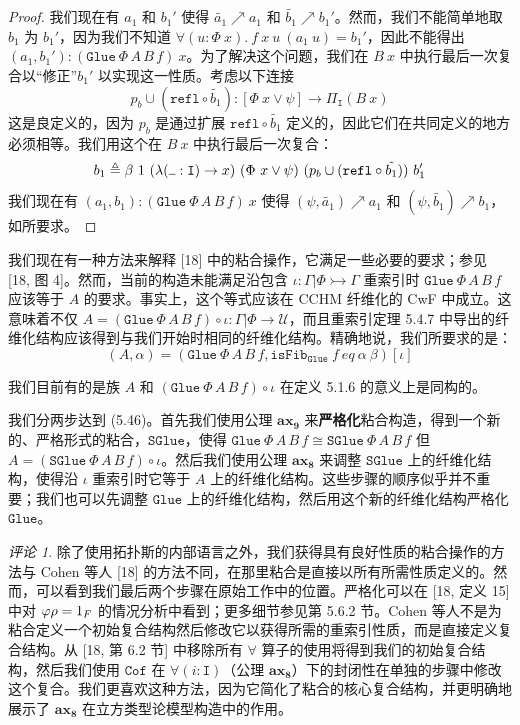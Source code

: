 \documentclass{ctexrep}
\let\mathbb\relax %
\theoremstyle{plain}
\theoremstyle{definition}
\theoremstyle{remark}
\newtheorem{remark}[theorem]{评论}
\newcommand\ttI{\mathtt{I}}
\newcommand{\ax}[1]{\mathbf{ax_{#1}}}
\newcommand{\ul}{{\rule[0ex]{0.5em}{0.4pt}}} %
\begin{document}
\begin{proof}
我们现在有 $a_1$ 和 $b_1'$ 使得 $\tilde{a_1} \nearrow a_1$ 和 $\tilde{b_1} \nearrow b_1'$。然而，我们不能简单地取 $b_1$ 为 $b_1'$，因为我们不知道 $\forall(u : \Phi\ x).\ f\ x\ u\ (a_1\ u) = b_1'$，因此不能得出 $(a_1, b_1') : (\mathtt{Glue}\ \Phi\,A\,B\,f)\ x$。为了解决这个问题，我们在 $B\ x$ 中执行最后一次复合以``修正''$b_1'$ 以实现这一性质。考虑以下连接
\[
p_b \cup (\mathtt{refl} \circ \tilde{b_1}) : [\Phi\ x \lor \psi] \to \Pi_{\ttI}(B\ x)
\]
这是良定义的，因为 $p_b$ 是通过扩展 $\mathtt{refl} \circ \tilde{b_1}$ 定义的，因此它们在共同定义的地方必须相等。我们用这个在 $B\ x$ 中执行最后一次复合：
\[
b_1 \triangleq \beta\ 1\ (\lambda(\ul  : \ttI) \to x)\ (\Phi\ x \lor \psi)\ (p_b \cup (\mathtt{refl} \circ \tilde{b_1}))\ b_1'
\]
我们现在有 $(a_1, b_1) : (\mathtt{Glue}\ \Phi\,A\,B\,f)\ x$ 使得 $(\psi, \tilde{a_1}) \nearrow a_1$ 和 $(\psi, \tilde{b_1}) \nearrow b_1$，如所要求。
\end{proof}

我们现在有一种方法来解释 [18] 中的粘合操作，它满足一些必要的要求；参见 [18, 图 4]。然而，当前的构造未能满足沿包含 $\iota : \Gamma|\Phi \rightarrowtail \Gamma$ 重索引时 $\mathtt{Glue}\ \Phi\,A\,B\,f$ 应该等于 $A$ 的要求。事实上，这个等式应该在 CCHM 纤维化的 CwF 中成立。这意味着不仅 $A = (\mathtt{Glue}\ \Phi\,A\,B\,f) \circ \iota : \Gamma|\Phi \to \mathcal{U}$，而且重索引定理 5.4.7 中导出的纤维化结构应该得到与我们开始时相同的纤维化结构。精确地说，我们所要求的是：
\begin{equation}
(A, \alpha) = (\mathtt{Glue}\ \Phi\,A\,B\,f, \mathtt{isFib}_{\mathtt{Glue}}\ f\ eq\ \alpha\ \beta)[\iota]
\end{equation}

我们目前有的是族 $A$ 和 $(\mathtt{Glue}\ \Phi\,A\,B\,f) \circ \iota$ 在定义 5.1.6 的意义上是同构的。

我们分两步达到 (5.46)。首先我们使用公理 $\ax{9}$ 来\textbf{严格化}粘合构造，得到一个新的、严格形式的粘合，$\mathtt{SGlue}$，使得 $\mathtt{Glue}\ \Phi\,A\,B\,f \cong \mathtt{SGlue}\ \Phi\,A\,B\,f$ 但 $A = (\mathtt{SGlue}\ \Phi\,A\,B\,f) \circ \iota$。然后我们使用公理 $\ax{8}$ 来调整 $\mathtt{SGlue}$ 上的纤维化结构，使得沿 $\iota$ 重索引时它等于 $A$ 上的纤维化结构。这些步骤的顺序似乎并不重要；我们也可以先调整 $\mathtt{Glue}$ 上的纤维化结构，然后用这个新的纤维化结构严格化 $\mathtt{Glue}$。

\begin{remark}
除了使用拓扑斯的内部语言之外，我们获得具有良好性质的粘合操作的方法与 Cohen 等人 [18] 的方法不同，在那里粘合是直接以所有所需性质定义的。然而，可以看到我们最后两个步骤在原始工作中的位置。严格化可以在 [18, 定义 15] 中对 $\varphi\rho = 1_\mathbb{F}$ 的情况分析中看到；更多细节参见第 5.6.2 节。Cohen 等人不是为粘合定义一个初始复合结构然后修改它以获得所需的重索引性质，而是直接定义复合结构。从 [18, 第 6.2 节] 中移除所有 $\forall$ 算子的使用将得到我们的初始复合结构，然后我们使用 $\mathtt{Cof}$ 在 $\forall(i : \ttI)$（公理 $\ax{8}$）下的封闭性在单独的步骤中修改这个复合。我们更喜欢这种方法，因为它简化了粘合的核心复合结构，并更明确地展示了 $\ax{8}$ 在立方类型论模型构造中的作用。
\end{remark}
\end{document}
